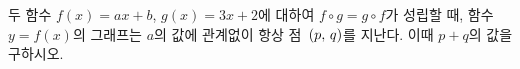 \hspace*{2mm}\begin{minipage}[t]{\dimexpr\linewidth-2mm\relax}\vspace{0pt}
두 함수 $f(x)=ax+b$, $g(x)=3x+2$에 대하여 $f\circ g=g\circ f$가 성립할 때, 함수 $y=f(x)$의 그래프는 $a$의 값에 관계없이 항상 점~$(p,\mkern3mu q)$를 지난다. 이때 $p+q$의 값을 구하시오. \end{minipage}
